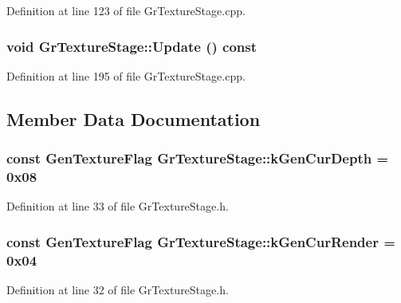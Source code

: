 \begin{CompactItemize}
Definition at line 123 of file GrTextureStage.cpp.\hypertarget{class_gr_texture_stage_72dad18b9bc9adbad72138920b6e7fdf}{
\subsubsection[{Update}]{\setlength{\rightskip}{0pt plus 5cm}void GrTextureStage::Update () const}}
\label{class_gr_texture_stage_72dad18b9bc9adbad72138920b6e7fdf}




Definition at line 195 of file GrTextureStage.cpp.

\subsection{Member Data Documentation}
\hypertarget{class_gr_texture_stage_9aaa704c6b85414a990ba3327e83ccf2}{
\subsubsection[{kGenCurDepth}]{\setlength{\rightskip}{0pt plus 5cm}const {\bf GenTextureFlag} {\bf GrTextureStage::kGenCurDepth} = 0x08}}
\label{class_gr_texture_stage_9aaa704c6b85414a990ba3327e83ccf2}




Definition at line 33 of file GrTextureStage.h.\hypertarget{class_gr_texture_stage_2e5a1af71fd34ff5f174493b3da79496}{
\subsubsection[{kGenCurRender}]{\setlength{\rightskip}{0pt plus 5cm}const {\bf GenTextureFlag} {\bf GrTextureStage::kGenCurRender} = 0x04}}
\label{class_gr_texture_stage_2e5a1af71fd34ff5f174493b3da79496}




Definition at line 32 of file GrTextureStage.h.\hypertarget{class_gr_texture_stage_c8c9e946cb577f989ca9fc7a922858c8}{
}
\end{CompactItemize}
